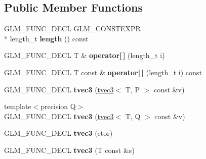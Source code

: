 \subsection*{Public Member Functions}
\begin{DoxyCompactItemize}
\item 
\hypertarget{structglm_1_1detail_1_1tvec3_ab94f5ac7a44a25ff2f532b20763f0b1d}{G\-L\-M\-\_\-\-F\-U\-N\-C\-\_\-\-D\-E\-C\-L G\-L\-M\-\_\-\-C\-O\-N\-S\-T\-E\-X\-P\-R \\*
length\-\_\-t {\bfseries length} () const }\label{structglm_1_1detail_1_1tvec3_ab94f5ac7a44a25ff2f532b20763f0b1d}

\item 
\hypertarget{structglm_1_1detail_1_1tvec3_a45e7f76041f4836b8855395fb8c6e244}{G\-L\-M\-\_\-\-F\-U\-N\-C\-\_\-\-D\-E\-C\-L T \& {\bfseries operator\mbox{[}$\,$\mbox{]}} (length\-\_\-t i)}\label{structglm_1_1detail_1_1tvec3_a45e7f76041f4836b8855395fb8c6e244}

\item 
\hypertarget{structglm_1_1detail_1_1tvec3_ac5a8ca23923813c57bf1526aa50f0f5b}{G\-L\-M\-\_\-\-F\-U\-N\-C\-\_\-\-D\-E\-C\-L T const \& {\bfseries operator\mbox{[}$\,$\mbox{]}} (length\-\_\-t i) const }\label{structglm_1_1detail_1_1tvec3_ac5a8ca23923813c57bf1526aa50f0f5b}

\item 
\hypertarget{structglm_1_1detail_1_1tvec3_a4f0be98873dfb6134d369f817dcb9478}{G\-L\-M\-\_\-\-F\-U\-N\-C\-\_\-\-D\-E\-C\-L {\bfseries tvec3} (\hyperlink{structglm_1_1detail_1_1tvec3}{tvec3}$<$ T, P $>$ const \&v)}\label{structglm_1_1detail_1_1tvec3_a4f0be98873dfb6134d369f817dcb9478}

\item 
\hypertarget{structglm_1_1detail_1_1tvec3_ae092787775d3e74cf242744892eb3923}{{\footnotesize template$<$precision Q$>$ }\\G\-L\-M\-\_\-\-F\-U\-N\-C\-\_\-\-D\-E\-C\-L {\bfseries tvec3} (\hyperlink{structglm_1_1detail_1_1tvec3}{tvec3}$<$ T, Q $>$ const \&v)}\label{structglm_1_1detail_1_1tvec3_ae092787775d3e74cf242744892eb3923}

\item 
\hypertarget{structglm_1_1detail_1_1tvec3_a5c1bc887c279d54e39c038c1f201e60b}{G\-L\-M\-\_\-\-F\-U\-N\-C\-\_\-\-D\-E\-C\-L {\bfseries tvec3} (ctor)}\label{structglm_1_1detail_1_1tvec3_a5c1bc887c279d54e39c038c1f201e60b}

\item 
\hypertarget{structglm_1_1detail_1_1tvec3_a2a9b1dc81918af347e4726ee1666d5de}{G\-L\-M\-\_\-\-F\-U\-N\-C\-\_\-\-D\-E\-C\-L {\bfseries tvec3} (T const \&s)}\label{structglm_1_1detail_1_1tvec3_a2a9b1dc81918af347e4726ee1666d5de}


\end{DoxyCompactItemize}

